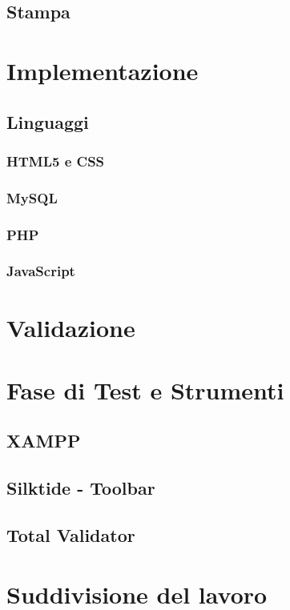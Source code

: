 \documentclass[a4paper, dvipsnames, table]{article}
\begin{document}
	\subsection{Stampa}
		

\newpage
\section{Implementazione}%
	\subsection{Linguaggi}
		\subsubsection{HTML5 e CSS}
			
		\subsubsection{MySQL}
			
		\subsubsection{PHP}
			
		\subsubsection{JavaScript}
			

\newpage
\section{Validazione}%
	

\newpage
\section{Fase di Test e Strumenti}%
	\subsection{XAMPP}
		
	\subsection{Silktide - Toolbar}
		
	\subsection{Total Validator}
		
	
\newpage
\section{Suddivisione del lavoro}
	
\end{document}
